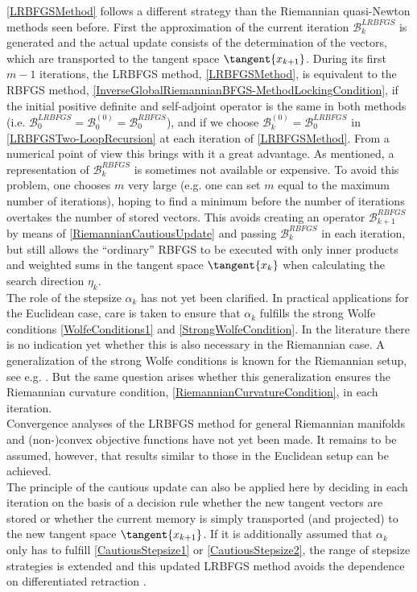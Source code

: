 \cref{LRBFGSMethod} follows a different strategy than the Riemannian quasi-Newton methods seen before. First the approximation of the current iteration $\mathcal{B}^{LRBFGS}_k$ is generated and the actual update consists of the determination of the vectors, which are transported to the tangent space $\tangent{x_{k+1}}$. During its first $m − 1$ iterations, the LRBFGS method, \cref{LRBFGSMethod}, is equivalent to the RBFGS method, \cref{InverseGlobalRiemannianBFGS-MethodLockingCondition}, if the initial positive definite and self-adjoint operator is the same in both methods (i.e. $\mathcal{B}^{LRBFGS}_0 = \mathcal{B}^{(0)}_0 = \mathcal{B}^{RBFGS}_0$), and if we choose $\mathcal{B}^{(0)}_k = \mathcal{B}^{LRBFGS}_0$ in \cref{LRBFGSTwo-LoopRecursion} at each iteration of \cref{LRBFGSMethod}. From a numerical point of view this brings with it a great advantage. As mentioned, a representation of $\mathcal{B}^{RBFGS}_k$ is sometimes not available or expensive. To avoid this problem, one chooses $m$ very large (e.g. one can set $m$ equal to the maximum number of iterations), hoping to find a minimum before the number of iterations overtakes the number of stored vectors. This avoids creating an operator $\mathcal{B}^{RBFGS}_{k+1}$ by means of \cref{RiemannianCautiousUpdate} and passing $\mathcal{B}^{RBFGS}_k$ in each iteration, but still allows the “ordinary” RBFGS to be executed with only inner products and weighted sums in the tangent space $\tangent{x_k}$ when calculating the search direction $\eta_k$. \\
The role of the stepsize $\alpha_k$ has not yet been clarified. In practical applications for the Euclidean case, care is taken to ensure that $\alpha_k$ fulfills the strong Wolfe conditions \cref{WolfeConditions1} and \cref{StrongWolfeCondition}. In the literature there is no indication yet whether this is also necessary in the Riemannian case. A generalization of the strong Wolfe conditions is known for the Riemannian setup, see e.g. \cite[p.~5]{SatoIwai:2015}. But the same question arises whether this generalization ensures the Riemannian curvature condition, \cref{RiemannianCurvatureCondition}, in each iteration.  \\
Convergence analyses of the LRBFGS method for general Riemannian manifolds and (non-)convex objective functions have not yet been made. It remains to be assumed, however, that results similar to those in the Euclidean setup can be achieved. \\
The principle of the cautious update can also be applied here by deciding in each iteration on the basis of a decision rule whether the new tangent vectors are stored or whether the current memory is simply transported (and projected) to the new tangent space $\tangent{x_{k+1}}$. If it is additionally assumed that $\alpha_k$ only has to fulfill \cref{CautiousStepsize1} or \cref{CautiousStepsize2}, the range of stepsize strategies is extended and this updated LRBFGS method avoids the dependence on differentiated retraction \cite[p.~486]{HuangAbsilGallivan:2018}. \\ 
